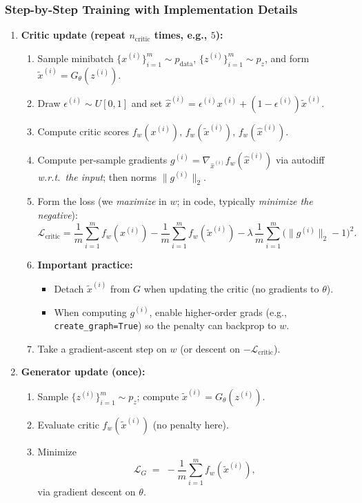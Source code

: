 \documentclass[11pt]{article}
\theoremstyle{remark}
\begin{document}
\subsubsection{Step-by-Step Training with Implementation Details}
\begin{enumerate}
\item \textbf{Critic update (repeat $n_{\text{critic}}$ times, e.g., $5$):}
\begin{enumerate}
\item Sample minibatch $\{x^{(i)}\}_{i=1}^m\sim p_{\text{data}}$, $\{z^{(i)}\}_{i=1}^m\sim p_z$, and form $\tilde{x}^{(i)}=G_\theta(z^{(i)})$.
\item Draw $\epsilon^{(i)}\sim U[0,1]$ and set $\hat{x}^{(i)}=\epsilon^{(i)}x^{(i)}+(1-\epsilon^{(i)})\tilde{x}^{(i)}$.
\item Compute critic scores $f_w(x^{(i)}),\,f_w(\tilde{x}^{(i)}),\,f_w(\hat{x}^{(i)})$.
\item Compute per-sample gradients $g^{(i)}=\nabla_{\hat{x}^{(i)}} f_w(\hat{x}^{(i)})$ via autodiff \emph{w.r.t.\ the input}; then norms $\|g^{(i)}\|_2$.
\item Form the loss (we \emph{maximize} in $w$; in code, typically \emph{minimize the negative}):
\[
\mathcal{L}_{\text{critic}}
=
\frac{1}{m}\!\sum_{i=1}^m f_w(x^{(i)})
- \frac{1}{m}\!\sum_{i=1}^m f_w(\tilde{x}^{(i)})
- \lambda\,\frac{1}{m}\!\sum_{i=1}^m \big(\|g^{(i)}\|_2-1\big)^2.
\]
\item \textbf{Important practice:}
\begin{itemize}
\item Detach $\tilde{x}^{(i)}$ from $G$ when updating the critic (no gradients to $\theta$).
\item When computing $g^{(i)}$, enable higher-order grads (e.g., \texttt{create\_graph=True}) so the penalty can backprop to $w$.
\end{itemize}
\item Take a gradient-ascent step on $w$ (or descent on $-\mathcal{L}_{\text{critic}}$).
\end{enumerate}

\item \textbf{Generator update (once):}
\begin{enumerate}
\item Sample $\{z^{(i)}\}_{i=1}^m\sim p_z$; compute $\tilde{x}^{(i)}=G_\theta(z^{(i)})$.
\item Evaluate critic $f_w(\tilde{x}^{(i)})$ (no penalty here).
\item Minimize
\[
\mathcal{L}_G \;=\; -\frac{1}{m}\sum_{i=1}^m f_w(\tilde{x}^{(i)}),
\]
via gradient descent on $\theta$.
\end{enumerate}
\end{enumerate}
\end{document}

